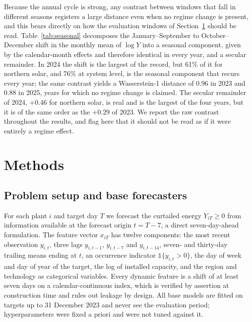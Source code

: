 \documentclass[preprint,3p,times]{elsarticle}
\begin{document}
Because the annual cycle is strong, any contrast between windows that fall in different seasons registers a large distance even when no regime change is present, and this bears directly on how the evaluation windows of Section~\ref{sec:methods} should be read. Table~\ref{tab:seasonal} decomposes the January--September to October--December shift in the monthly mean of $\log Y$ into a seasonal component, given by the calendar-month effects and therefore identical in every year, and a secular remainder. In 2024 the shift is the largest of the record, but 61\% of it for northern solar, and 76\% at system level, is the seasonal component that recurs every year; the same contrast yields a Wasserstein-1 distance of 0.96 in 2023 and 0.88 in 2025, years for which no regime change is claimed. The secular remainder of 2024, $+0.46$ for northern solar, is real and is the largest of the four years, but it is of the same order as the $+0.29$ of 2023. We report the raw contrast throughout the results, and flag here that it should not be read as if it were entirely a regime effect.



\section{Methods}
\label{sec:methods}

\subsection{Problem setup and base forecasters}
\label{sec:base}

For each plant $i$ and target day $T$ we forecast the curtailed energy $Y_{iT}\ge 0$ from information available at the forecast origin $t=T-7$, a direct seven-day-ahead formulation. The feature vector $x_{iT}$ has twelve components: the most recent observation $y_{i,t}$, three lags $y_{i,t-1}$, $y_{i,t-7}$ and $y_{i,t-14}$, seven- and thirty-day trailing means ending at $t$, an occurrence indicator $\mathbb{1}\{y_{i,t}>0\}$, the day of week and day of year of the target, the log of installed capacity, and the region and technology as categorical variables. Every dynamic feature is a shift of at least seven days on a calendar-continuous index, which is verified by assertion at construction time and rules out leakage by design. All base models are fitted on targets up to 31 December 2023 and never see the evaluation period; hyperparameters were fixed a priori and were not tuned against it.
\end{document}

